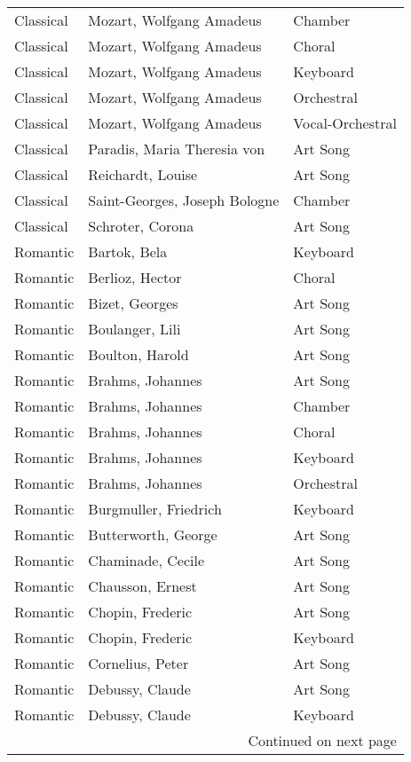 \begin{table}[!htbp]
\begin{tabular}{@{}lll@{}}
        Classical & Mozart, Wolfgang Amadeus & Chamber \\
        Classical & Mozart, Wolfgang Amadeus & Choral \\
        Classical & Mozart, Wolfgang Amadeus & Keyboard \\
        Classical & Mozart, Wolfgang Amadeus & Orchestral \\
        Classical & Mozart, Wolfgang Amadeus & Vocal-Orchestral \\
        Classical & Paradis, Maria Theresia von & Art Song \\
        Classical & Reichardt, Louise & Art Song \\
        Classical & Saint-Georges, Joseph Bologne & Chamber \\
        Classical & Schroter, Corona & Art Song \\
        Romantic & Bartok, Bela & Keyboard \\
        Romantic & Berlioz, Hector & Choral \\
        Romantic & Bizet, Georges & Art Song \\
        Romantic & Boulanger, Lili & Art Song \\
        Romantic & Boulton, Harold & Art Song \\
        Romantic & Brahms, Johannes & Art Song \\
        Romantic & Brahms, Johannes & Chamber \\
        Romantic & Brahms, Johannes & Choral \\
        Romantic & Brahms, Johannes & Keyboard \\
        Romantic & Brahms, Johannes & Orchestral \\
        Romantic & Burgmuller, Friedrich & Keyboard \\
        Romantic & Butterworth, George & Art Song \\
        Romantic & Chaminade, Cecile & Art Song \\
        Romantic & Chausson, Ernest & Art Song \\
        Romantic & Chopin, Frederic & Art Song \\
        Romantic & Chopin, Frederic & Keyboard \\
        Romantic & Cornelius, Peter & Art Song \\
        Romantic & Debussy, Claude & Art Song \\
        Romantic & Debussy, Claude & Keyboard \\
        \bottomrule
        \multicolumn{3}{r}{Continued on next page}
    \end{tabular}
\end{table}

